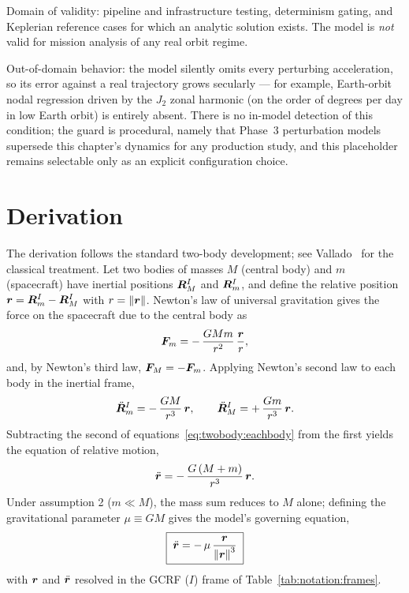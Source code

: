 Domain of validity: pipeline and infrastructure testing, determinism gating,
and Keplerian reference cases for which an analytic solution exists. The
model is \emph{not} valid for mission analysis of any real orbit regime.

Out-of-domain behavior: the model silently omits every perturbing
acceleration, so its error against a real trajectory grows secularly --- for
example, Earth-orbit nodal regression driven by the $J_2$ zonal harmonic (on
the order of degrees per day in low Earth orbit) is entirely absent. There is
no in-model detection of this condition; the guard is procedural, namely that
Phase~3 perturbation models supersede this chapter's dynamics for any
production study, and this placeholder remains selectable only as an explicit
configuration choice.

\section{Derivation}
\label{sec:twobody:derivation}

The derivation follows the standard two-body development; see
Vallado~\cite{vallado2013} for the classical treatment. Let two bodies of
masses $M$ (central body) and $m$ (spacecraft) have inertial positions
$\bm{R}_M^{I}$ and $\bm{R}_m^{I}$, and define the relative position
$\bm{r} = \bm{R}_m^{I} - \bm{R}_M^{I}$ with $r = \left\lVert \bm{r} \right\rVert$. Newton's law
of universal gravitation gives the force on the spacecraft due to the central
body as
\begin{equation}
  \bm{F}_{m} = -\,\frac{G M m}{r^{2}}\,\frac{\bm{r}}{r},
  \label{eq:twobody:newton}
\end{equation}
and, by Newton's third law, $\bm{F}_{M} = -\bm{F}_{m}$. Applying Newton's
second law to each body in the inertial frame,
\begin{equation}
  \ddot{\bm{R}}_m^{I} = -\,\frac{G M}{r^{3}}\,\bm{r},
  \qquad
  \ddot{\bm{R}}_M^{I} = +\,\frac{G m}{r^{3}}\,\bm{r}.
  \label{eq:twobody:eachbody}
\end{equation}
Subtracting the second of equations~\eqref{eq:twobody:eachbody} from the
first yields the equation of relative motion,
\begin{equation}
  \ddot{\bm{r}} = -\,\frac{G\,(M + m)}{r^{3}}\,\bm{r}.
  \label{eq:twobody:relative}
\end{equation}
Under assumption 2 ($m \ll M$), the mass sum reduces to $M$ alone; defining
the gravitational parameter $\mu \equiv G M$ gives the model's governing
equation,
\begin{equation}
  \boxed{\;\ddot{\bm{r}} = -\,\mu\,\frac{\bm{r}}{\left\lVert \bm{r} \right\rVert^{3}}\;}
  \label{eq:twobody:accel}
\end{equation}
with $\bm{r}$ and $\ddot{\bm{r}}$ resolved in the GCRF ($I$) frame of
Table~\ref{tab:notation:frames}.

